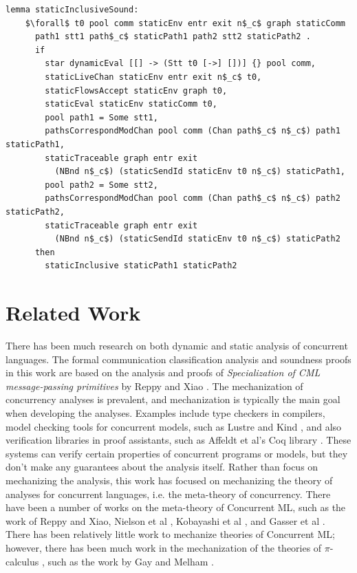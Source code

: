 \documentclass[letterpaper, 11pt]{extarticle}
\begin{document}
\begin{lstlisting}[language=logic, mathescape]
  lemma staticInclusiveSound:
    $\forall$ t0 pool comm staticEnv entr exit n$_c$ graph staticComm
      path1 stt1 path$_c$ staticPath1 path2 stt2 staticPath2 .
      if
        star dynamicEval [[] -> (Stt t0 [->] [])] {} pool comm, 
        staticLiveChan staticEnv entr exit n$_c$ t0, 
        staticFlowsAccept staticEnv graph t0, 
        staticEval staticEnv staticComm t0, 
        pool path1 = Some stt1, 
        pathsCorrespondModChan pool comm (Chan path$_c$ n$_c$) path1 staticPath1, 
        staticTraceable graph entr exit
          (NBnd n$_c$) (staticSendId staticEnv t0 n$_c$) staticPath1, 
        pool path2 = Some stt2, 
        pathsCorrespondModChan pool comm (Chan path$_c$ n$_c$) path2 staticPath2, 
        staticTraceable graph entr exit
          (NBnd n$_c$) (staticSendId staticEnv t0 n$_c$) staticPath2
      then
        staticInclusive staticPath1 staticPath2
\end{lstlisting}

  



\section{Related Work}
There has been much research on both dynamic and static analysis of concurrent languages.  
The formal communication classification analysis and soundness proofs in this work are
based on the analysis and proofs of \textit{Specialization of CML message-passing primitives}
by Reppy and Xiao \cite{reppy2007specialization}.
The mechanization of concurrency analyses is prevalent, and mechanization is typically the main
goal when developing the analyses. Examples include type checkers in compilers,
model checking tools for concurrent models, such as Lustre \cite{halbwachs1991synchronous} and Kind \cite{kind},
and also verification libraries in proof assistants, such as Affeldt et al's Coq library \cite{affeldt2008coq}.
These systems can verify certain properties of concurrent programs or models, but they don't
make any guarantees about the analysis itself.
Rather than focus on mechanizing the analysis, this work has focused on
mechanizing the theory of analyses for concurrent languages, i.e. the meta-theory of concurrency.
There have been a number of works on the meta-theory of Concurrent ML,
such as the work of Reppy and Xiao, Nielson et al \cite{nielson1994higher}, Kobayashi et al \cite{kobayashi1995static}, and Gasser et al \cite{gasser1997systematic}.
There has been relatively little work to mechanize theories of Concurrent ML; however,
there has been much work in the mechanization of the theories of $\pi$-calculus
\cite{milner1999communicating}, such as the work by Gay \cite{gay2001framework} and Melham \cite{melham1994mechanized}. 
\end{document}
